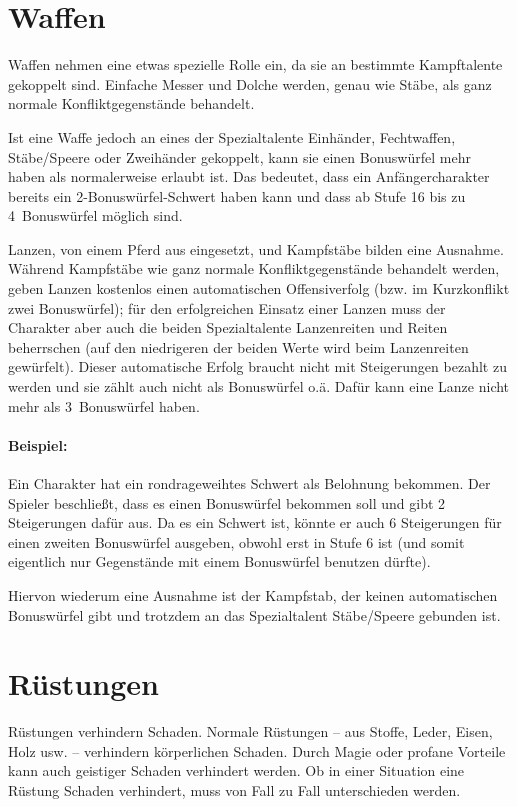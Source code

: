 \section{Waffen}
Waffen nehmen eine etwas spezielle Rolle ein, da sie an bestimmte Kampftalente gekoppelt sind. Einfache Messer und Dolche werden, genau wie Stäbe, als ganz normale Konfliktgegenstände behandelt.

Ist eine Waffe jedoch an eines der Spezialtalente Einhänder, Fechtwaffen, Stäbe/Speere oder Zweihänder gekoppelt, kann sie einen Bonuswürfel mehr haben als normalerweise erlaubt ist. Das bedeutet, dass ein Anfängercharakter bereits ein 2-Bonuswürfel-Schwert haben kann und dass ab Stufe 16 bis zu 4~Bonuswürfel möglich sind.

Lanzen, von einem Pferd aus eingesetzt, und Kampfstäbe bilden eine Ausnahme. Während Kampfstäbe wie ganz normale Konfliktgegenstände behandelt werden, geben Lanzen kostenlos einen automatischen Offensiverfolg (bzw. im Kurzkonflikt zwei Bonuswürfel); für den erfolgreichen Einsatz einer Lanzen muss der Charakter aber auch die beiden Spezialtalente Lanzenreiten und Reiten beherrschen (auf den niedrigeren der beiden Werte wird beim Lanzenreiten gewürfelt). Dieser automatische Erfolg braucht nicht mit Steigerungen bezahlt zu werden und sie zählt auch nicht als Bonuswürfel o.ä. Dafür kann eine Lanze nicht mehr als 3~Bonuswürfel haben.

\begin{beispiel}
\paragraph{Beispiel:}
Ein Charakter hat ein rondrageweihtes Schwert als Belohnung bekommen. Der Spieler beschließt, dass es einen Bonuswürfel bekommen soll und gibt 2 Steigerungen dafür aus. Da es ein Schwert ist, könnte er auch 6 Steigerungen für einen zweiten Bonuswürfel ausgeben, obwohl erst in Stufe 6 ist (und somit eigentlich nur Gegenstände mit einem Bonuswürfel benutzen dürfte).
\end{beispiel}

Hiervon wiederum eine Ausnahme ist der Kampfstab, der keinen automatischen Bonuswürfel gibt und trotzdem an das Spezialtalent Stäbe/Speere gebunden ist.

\section{Rüstungen}
 Rüstungen verhindern Schaden. Normale Rüstungen -- aus Stoffe, Leder, Eisen, Holz usw. -- verhindern körperlichen Schaden. Durch Magie oder profane Vorteile kann auch geistiger Schaden verhindert werden. Ob in einer Situation eine Rüstung Schaden verhindert, muss von Fall zu Fall unterschieden werden.

